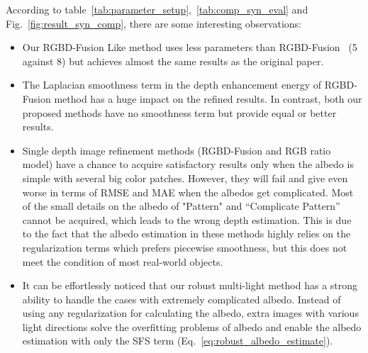 According to table~\ref{tab:parameter_setup},~\ref{tab:comp_syn_eval} and Fig.~\ref{fig:result_syn_comp}, there are some interesting observations:
\begin{itemize}
    \item Our RGBD-Fusion Like method uses less parameters than RGBD-Fusion~\cite{or2015rgbd} (5 against 8) but achieves almost the same results as the original paper. 
    \item The Laplacian smoothness term in the depth enhancement energy of RGBD-Fusion method has a huge impact on the refined results. In contrast, both our proposed methods have no smoothness term but provide equal or better results.
    \item Single depth image refinement methods (RGBD-Fusion and RGB ratio model) have a chance to acquire satisfactory results only when the albedo is simple with several big color patches. 
    However, they will fail and give even worse in terms of RMSE and MAE when the albedos get complicated. 
    Most of the small details on the albedo of "Pattern" and ``Complicate Pattern'' cannot be acquired, which leads to the wrong depth estimation.
    This is due to the fact that the albedo estimation in these methods highly relies on the regularization terms which prefers piecewise smoothness, but this does not meet the condition of most real-world objects.
    \item It can be effortlessly noticed that our robust multi-light method has a strong ability to handle the cases with extremely complicated albedo. 
    Instead of using any regularization for calculating the albedo, extra images with various light directions solve the overfitting problems of albedo and enable the albedo estimation with only the SFS term (Eq.~\ref{eq:robust_albedo_estimate}).
\end{itemize}




